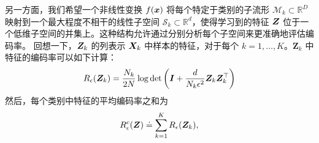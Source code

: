 \documentclass[../../book-main_zh.tex]{subfiles}
\begin{document}
另一方面，我们希望一个非线性变换 $f(\bm{x})$ 将每个特定于类别的子流形 $\mathcal{M}_k \subset \mathbb{R}^D$ 映射到一个最大程度不相干的线性子空间 $\mathcal{S}_k \subset \mathbb{R}^d$，使得学习到的特征 $\bm{Z}$ 位于一个低维子空间的并集上。这种结构允许通过分别分析每个子空间来更准确地评估编码率。%
回想一下，$\bm{Z}_k$ 的列表示 $\bm{X}_k$ 中样本的特征，对于每个 $k=1,\dots,K$。$\bm Z_k$ 中特征的编码率可以如下计算：
\begin{align}
    R_{\epsilon}(\bm{Z}_k) = \frac{N_k}{2N}\log\det\left(\bm{I} + \frac{d}{N_k\epsilon^{2}}\bm{Z}_k\bm{Z}_k^{\top}\right)
\end{align}
然后，每个类别中特征的平均编码率之和为
\begin{equation}
	 R_{\epsilon}^c(\bm{Z}) \doteq \sum_{k=1}^K R_{\epsilon}(\bm{Z}_k),
	\label{chap4-eqn:compress-loss-eval}
\end{equation}
\end{document}
